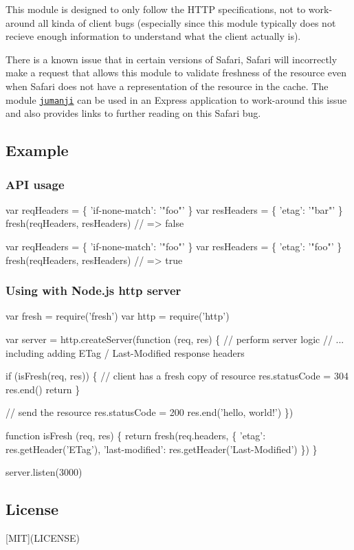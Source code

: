 This module is designed to only follow the H\+T\+TP specifications, not to work-\/around all kinda of client bugs (especially since this module typically does not recieve enough information to understand what the client actually is).

There is a known issue that in certain versions of Safari, Safari will incorrectly make a request that allows this module to validate freshness of the resource even when Safari does not have a representation of the resource in the cache. The module \href{https://www.npmjs.com/package/jumanji}{\tt jumanji} can be used in an Express application to work-\/around this issue and also provides links to further reading on this Safari bug.

\subsection*{Example}

\subsubsection*{A\+PI usage}


\begin{DoxyCode}
var reqHeaders = \{ 'if-none-match': '"foo"' \}
var resHeaders = \{ 'etag': '"bar"' \}
fresh(reqHeaders, resHeaders)
// => false

var reqHeaders = \{ 'if-none-match': '"foo"' \}
var resHeaders = \{ 'etag': '"foo"' \}
fresh(reqHeaders, resHeaders)
// => true
\end{DoxyCode}


\subsubsection*{Using with Node.\+js http server}


\begin{DoxyCode}
var fresh = require('fresh')
var http = require('http')

var server = http.createServer(function (req, res) \{
  // perform server logic
  // ... including adding ETag / Last-Modified response headers

  if (isFresh(req, res)) \{
    // client has a fresh copy of resource
    res.statusCode = 304
    res.end()
    return
  \}

  // send the resource
  res.statusCode = 200
  res.end('hello, world!')
\})

function isFresh (req, res) \{
  return fresh(req.headers, \{
    'etag': res.getHeader('ETag'),
    'last-modified': res.getHeader('Last-Modified')
  \})
\}

server.listen(3000)
\end{DoxyCode}


\subsection*{License}

\mbox{[}M\+IT\mbox{]}(L\+I\+C\+E\+N\+SE) 